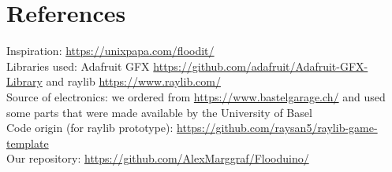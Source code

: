 \documentclass[10pt, a4paper]{article}
\begin{document}
\section*{References}
Inspiration: \url{https://unixpapa.com/floodit/} \\
Libraries used: Adafruit GFX \url{https://github.com/adafruit/Adafruit-GFX-Library} and raylib \url{https://www.raylib.com/} \\
Source of electronics: we ordered from \url{https://www.bastelgarage.ch/} and used some parts that were made available by the University of Basel \\
Code origin (for raylib prototype): \url{https://github.com/raysan5/raylib-game-template}\\
Our repository: \url{https://github.com/AlexMarggraf/Flooduino/}
\end{document}
